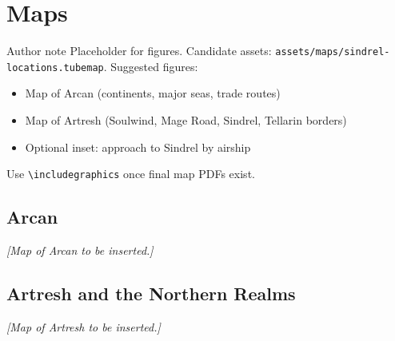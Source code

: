 \chapter{Maps}

\begin{DndComment}{Author note}
  Placeholder for figures. Candidate assets: \texttt{assets/maps/sindrel-locations.tubemap}.
  Suggested figures:
  \begin{itemize}
    \item Map of Arcan (continents, major seas, trade routes)
    \item Map of Artresh (Soulwind, Mage Road, Sindrel, Tellarin borders)
    \item Optional inset: approach to Sindrel by airship
  \end{itemize}
  Use \texttt{\textbackslash includegraphics} once final map PDFs exist.
\end{DndComment}

\section{Arcan}


\textit{[Map of Arcan to be inserted.]}

\section{Artresh and the Northern Realms}

\textit{[Map of Artresh to be inserted.]}
